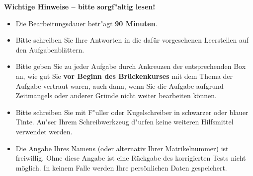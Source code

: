 \documentclass[12pt]{exam}
\begin{document}
\begin{center} \textbf{Wichtige Hinweise -- bitte sorgf"altig lesen!} \end{center}
\begin{itemize}
\item Die Bearbeitungsdauer betr"agt \textbf{90 Minuten}.

\item Bitte schreiben Sie Ihre Antworten in die daf\"ur vorgesehenen
Leerstellen auf den Aufgabenbl\"attern.

\item Bitte geben Sie zu jeder Aufgabe durch Ankreuzen der entsprechenden
Box an, wie gut Sie \textbf{vor Beginn des Brückenkurses}
mit dem Thema der Aufgabe vertraut waren, auch dann,
wenn Sie die Aufgabe aufgrund Zeitmangels oder anderer Gründe
nicht weiter bearbeiten können.

\item Bitte schreiben Sie mit F"uller oder Kugelschreiber in schwarzer oder
blauer Tinte. Au"ser Ihrem Schreibwerkzeug 
d"urfen keine weiteren Hilfsmittel verwendet werden.

\item Die Angabe Ihres Namens (oder alternativ Ihrer Matrikelnummer) ist
freiwillig. Ohne diese Angabe ist eine Rückgabe des korrigierten Tests
nicht möglich. In keinem Falle werden Ihre persönlichen Daten gespeichert.

\end{itemize}

\clearpage
\end{document}
